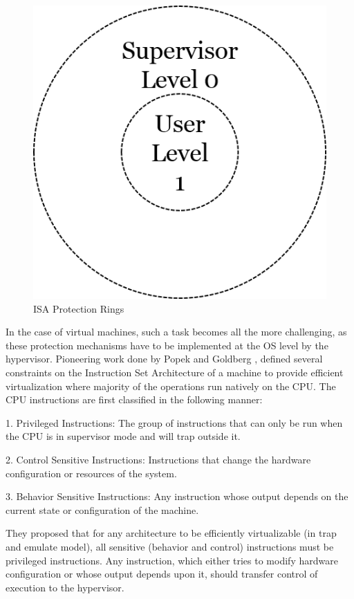 \begin{figure}[H]
  \centering
  \includegraphics[scale=0.6]{figures/protect_levels.png}
  \caption{ISA Protection Rings}
  \label{fig:protect_2}
\end{figure}
In the case of virtual machines, such a task becomes all the more challenging, as these protection mechanisms have to be implemented at the OS level by the hypervisor. Pioneering work done by Popek and Goldberg \cite{popek}, defined several constraints on the Instruction Set Architecture of a machine to provide efficient virtualization where majority of the operations run natively on the CPU. The CPU instructions are first classified in the following manner:

1. Privileged Instructions: The group of instructions that can only be run when the CPU is in supervisor mode and will trap outside it.

2. Control Sensitive Instructions: Instructions that change the hardware configuration or resources of the system.

3. Behavior Sensitive Instructions: Any instruction whose output depends on the current state or configuration of the machine.

They proposed that for any architecture to be efficiently virtualizable (in trap and emulate model), all sensitive (behavior and control) instructions must be privileged instructions. Any instruction, which either tries to modify hardware configuration or whose output depends upon it, should transfer control of execution to the hypervisor.

